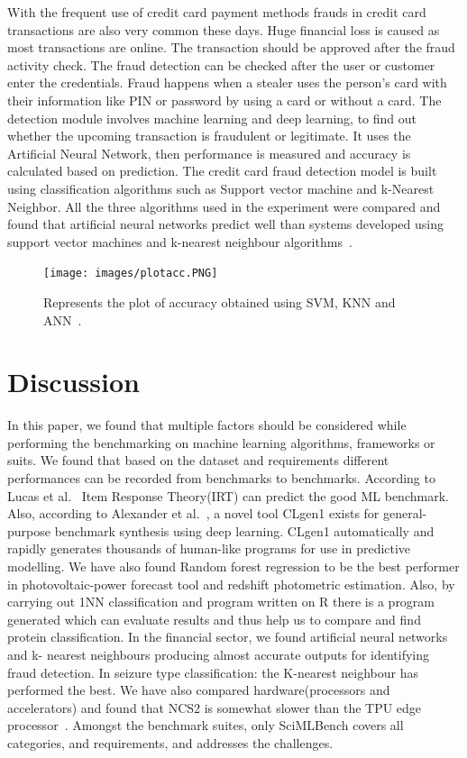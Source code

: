 \documentclass[a4paper,UKenglish,cleveref, autoref, thm-restate]{lipics-v2021}
\begin{document}
With the frequent use of credit card payment methods frauds in credit card transactions are also very common these days. 
Huge financial loss is caused as most transactions are online.
The transaction should be approved after the fraud activity check. The fraud detection can be checked after the user or customer enter the credentials. Fraud happens when a stealer uses the person's card with their information like PIN or password by using a card or without a card.
The detection module
involves machine learning and deep learning, to find out whether
the upcoming transaction is fraudulent or legitimate. It uses the Artificial Neural Network, then performance is measured and accuracy is calculated based on prediction. The credit card fraud detection model is built using classification algorithms such as Support vector machine and k-Nearest Neighbor. All the three
algorithms used in the experiment were compared and found that artificial
neural networks predict well than systems developed using support vector machines and k-nearest neighbour algorithms~\cite{fraud}.
\begin{figure}[ht]
    \centering
    \texttt{[image: images/plotacc.PNG]}
    \caption{Represents the plot of accuracy obtained using
SVM, KNN and ANN~\cite{fraud}.}
    \label{fig:hardwareperformance}
\end{figure}
\section{Discussion}
\label{Discussion}
In this paper, we found that multiple factors should be considered while performing the benchmarking on machine learning algorithms, frameworks or suits. We found that based on the dataset and requirements different performances can be recorded from benchmarks to benchmarks.  According to Lucas et al.~\cite{decodingmlb} Item Response Theory(IRT) can predict the good ML benchmark. Also, according to Alexander et al.~\cite{casesynthesizing}, a novel tool CLgen1 exists for general-purpose benchmark synthesis using deep learning. CLgen1 automatically and rapidly generates thousands of human-like programs for use in predictive modelling.
We have also found Random forest regression to be the best performer in photovoltaic-power forecast tool and redshift photometric estimation. Also, by carrying out 1NN classification and program written on R there is a program generated which can evaluate results and thus help us to compare and find protein classification.
In the financial sector, we found artificial neural networks and k- nearest neighbours producing almost accurate outputs for identifying fraud detection. In seizure type classification: the K-nearest neighbour has performed the best.
We have also compared hardware(processors and accelerators) and found that NCS2 is somewhat slower than the TPU edge processor~\cite{accele}. 
Amongst the benchmark suites, only SciMLBench covers all categories, and requirements, and addresses the challenges. 
\end{document}
